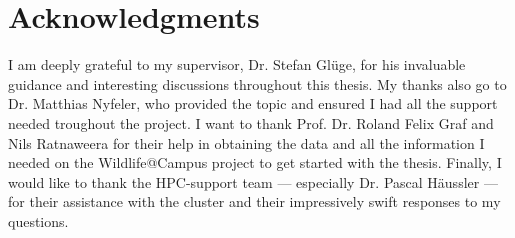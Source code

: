 

\vspace*{\fill}

\section*{Acknowledgments}
\label{acknowledgments}

I am deeply grateful to my supervisor, Dr. Stefan Glüge, for his invaluable guidance and interesting discussions throughout this thesis. 
My thanks also go to Dr. Matthias Nyfeler, who provided the topic and ensured I had all the support needed troughout the project. 
I want to thank Prof. Dr. Roland Felix Graf and Nils Ratnaweera for their help in obtaining the data and all the information I needed on the Wildlife@Campus project to get started with the thesis. 
Finally, I would like to thank the HPC-support team --- especially Dr. Pascal Häussler --- for their assistance with the cluster and their impressively swift responses to my questions.

\vspace*{\fill}
